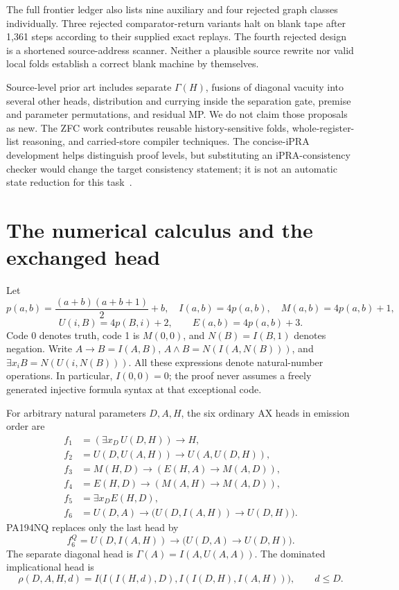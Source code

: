 \documentclass[10pt,letterpaper]{article}
\begin{document}
The full frontier ledger also lists nine auxiliary and four rejected graph
classes individually. Three rejected comparator-return variants halt on
blank tape after 1,361 steps according to their supplied exact replays.
The fourth rejected design is a shortened source-address scanner. Neither
a plausible source rewrite nor valid local folds establish a correct blank
machine by themselves.

Source-level prior art includes separate \(\Gamma(H)\), fusions of diagonal
vacuity into several other heads, distribution and currying inside the
separation gate, premise and parameter permutations, and residual MP.
We do not claim those proposals as new. The ZFC work contributes reusable
history-sensitive folds, whole-register-list reasoning, and carried-store
compiler techniques. The concise-iPRA development helps distinguish proof
levels, but substituting an iPRA-consistency checker would change the target
consistency statement; it is not an automatic state reduction for this
task~\cite{related}.

\section{The numerical calculus and the exchanged head}\label{sec:logic}

Let
\[
 p(a,b)=\frac{(a+b)(a+b+1)}2+b,
 \quad I(a,b)=4p(a,b),\quad M(a,b)=4p(a,b)+1,
\]
\[
 U(i,B)=4p(B,i)+2,\qquad E(a,b)=4p(a,b)+3.
\]
Code 0 denotes truth, code 1 is \(M(0,0)\), and \(N(B)=I(B,1)\) denotes
negation. Write \(A\to B=I(A,B)\),
\(A\wedge B=N(I(A,N(B)))\), and
\(\exists x_i B=N(U(i,N(B)))\).
All these expressions denote natural-number operations. In particular,
\(I(0,0)=0\); the proof never assumes a freely generated injective formula
syntax at that exceptional code.

For arbitrary natural parameters \(D,A,H\), the six ordinary AX heads in
emission order are
\begin{align*}
 f_1&=(\exists x_D\,U(D,H))\to H,\\
 f_2&=U(D,U(A,H))\to U(A,U(D,H)),\\
 f_3&=M(H,D)\to(E(H,A)\to M(A,D)),\\
 f_4&=E(H,D)\to(M(A,H)\to M(A,D)),\\
 f_5&=\exists x_D E(H,D),\\
 f_6&=U(D,A)\to\bigl(U(D,I(A,H))\to U(D,H)\bigr).
\end{align*}
PA194NQ replaces only the last head by
\begin{equation}\label{eq:exchanged-head}
 f_6^{Q}=U(D,I(A,H))\to\bigl(U(D,A)\to U(D,H)\bigr).
\end{equation}
The separate diagonal head is
\(\Gamma(A)=I(A,U(A,A))\). The dominated implicational head is
\[
 \rho(D,A,H,d)
 =I\bigl(I(I(H,d),D),I(I(D,H),I(A,H))\bigr),\qquad d\le D.
\]
\end{document}

